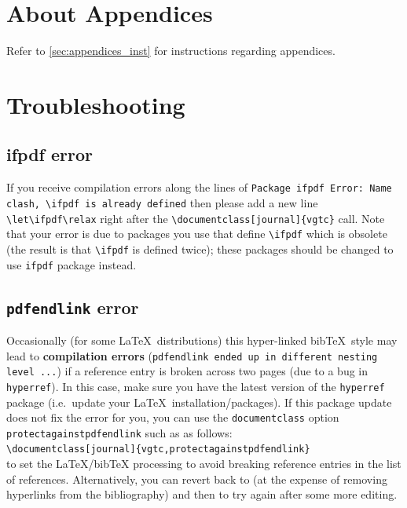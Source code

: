 \documentclass[journal]{vgtc}                     %
\begin{document}

%
%
%




\appendix %
{} %

\section{About Appendices}
Refer to \cref{sec:appendices_inst} for instructions regarding appendices.

\section{Troubleshooting}
\label{appendix:troubleshooting}

\subsection{ifpdf error}

If you receive compilation errors along the lines of \texttt{Package ifpdf Error: Name clash, \textbackslash ifpdf is already defined} then please add a new line \verb|\let\ifpdf\relax| right after the \verb|\documentclass[journal]{vgtc}| call.
Note that your error is due to packages you use that define \verb|\ifpdf| which is obsolete (the result is that \verb|\ifpdf| is defined twice); these packages should be changed to use \verb|ifpdf| package instead.


\subsection{\texttt{pdfendlink} error}

Occasionally (for some \LaTeX\ distributions) this hyper-linked bib\TeX\ style may lead to \textbf{compilation errors} (\texttt{pdfendlink ended up in different nesting level ...}) if a reference entry is broken across two pages (due to a bug in \verb|hyperref|).
In this case, make sure you have the latest version of the \verb|hyperref| package (i.e.\ update your \LaTeX\ installation/packages).
If this package update does not fix the error for you, you can use the \verb|documentclass| option \verb|protectagainstpdfendlink| such as as follows:\\[1ex]
{\footnotesize\verb|\documentclass[journal]{vgtc,protectagainstpdfendlink}|}\\[1ex]
to set the \LaTeX/bib\TeX{} processing to avoid breaking reference entries in the list of references. Alternatively, you can revert back to \verb|| (at the expense of removing hyperlinks from the bibliography) and then to try \verb|| again after some more editing.
\end{document}
